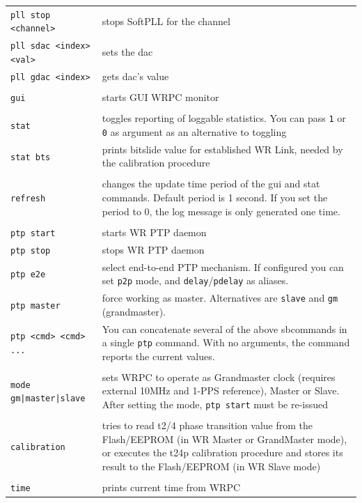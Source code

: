 \documentclass[a4paper, 12pt]{article}
\newcommand{\code}[1]{\texttt{#1}}
\begin{document}
\begin{longtable}{  p{7.5cm}  p{7cm} }
  \code{pll stop <channel>} & stops SoftPLL for the channel\\

  \code{pll sdac <index> <val>} & sets the dac\\

  \code{pll gdac <index>} & gets dac's value\\
 & \\
  \code{gui} & starts GUI WRPC monitor\\
 & \\
  \code{stat} & toggles reporting of loggable statistics. You can pass
\texttt{1} or \texttt{0} as argument as an alternative to toggling\\

  \code{stat bts} & prints bitslide value for established WR Link,
needed by the calibration procedure\\
 & \\
  \code{refresh} & changes the update time period of the gui and stat
commands. Default period is 1 second. If you set the period to 0, the log
message is only generated one time.\\
 & \\
  \code{ptp start} & starts WR PTP daemon\\

  \code{ptp stop} & stops WR PTP daemon\\

  \code{ptp e2e} & select end-to-end PTP mechanism. If configured you can set \texttt{p2p} mode, and \texttt{delay}/\texttt{pdelay} as aliases.\\

  \code{ptp master} & force working as master. Alternatives are \texttt{slave} and \texttt{gm} (grandmaster).\\

  \code{ptp <cmd> <cmd> ...} & You can concatenate several of the above sbcommands in a single \texttt{ptp} command. With no arguments, the command reports the current values.\\
 & \\
  \code{mode gm|master|slave} & sets WRPC to operate as Grandmaster
clock (requires external 10MHz and 1-PPS reference), Master or Slave. After
setting the mode, \texttt{ptp start} must be re-issued\\
 & \\
  \code{calibration} & tries to read t2/4 phase transition value from the
Flash/EEPROM (in WR Master or GrandMaster mode), or executes the t24p
calibration procedure and stores its result to the Flash/EEPROM (in WR 
Slave mode)\\
 & \\
  \code{time} & prints current time from WRPC\\


\end{longtable}
\end{document}

